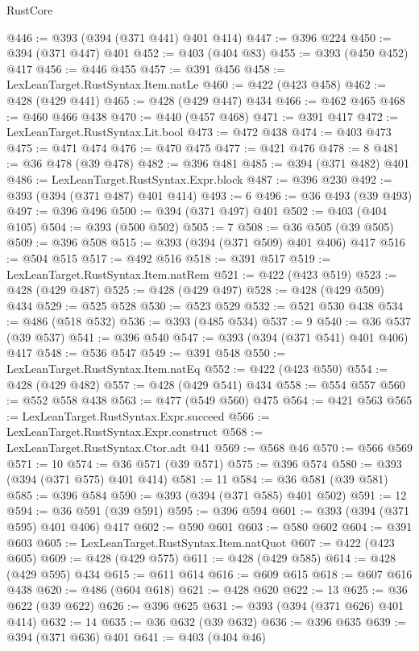 \begin{lexlean}{RustCore}
\begin{coremodule}
@446 := @393 (@394 (@371 @441) @401 @414)
@447 := @396 @224
@450 := @394 (@371 @447) @401
@452 := @403 (@404 @83)
@455 := @393 (@450 @452) @417
@456 := @446 @455
@457 := @391 @456
@458 := LexLeanTarget.RustSyntax.Item.natLe
@460 := @422 (@423 @458)
@462 := @428 (@429 @441)
@465 := @428 (@429 @447) @434
@466 := @462 @465
@468 := @460 @466 @438
@470 := @440 (@457 @468)
@471 := @391 @417
@472 := LexLeanTarget.RustSyntax.Lit.bool
@473 := @472 @438
@474 := @403 @473
@475 := @471 @474
@476 := @470 @475
@477 := @421 @476
@478 := 8
@481 := @36 @478 (@39 @478)
@482 := @396 @481
@485 := @394 (@371 @482) @401
@486 := LexLeanTarget.RustSyntax.Expr.block
@487 := @396 @230
@492 := @393 (@394 (@371 @487) @401 @414)
@493 := 6
@496 := @36 @493 (@39 @493)
@497 := @396 @496
@500 := @394 (@371 @497) @401
@502 := @403 (@404 @105)
@504 := @393 (@500 @502)
@505 := 7
@508 := @36 @505 (@39 @505)
@509 := @396 @508
@515 := @393 (@394 (@371 @509) @401 @406) @417
@516 := @504 @515
@517 := @492 @516
@518 := @391 @517
@519 := LexLeanTarget.RustSyntax.Item.natRem
@521 := @422 (@423 @519)
@523 := @428 (@429 @487)
@525 := @428 (@429 @497)
@528 := @428 (@429 @509) @434
@529 := @525 @528
@530 := @523 @529
@532 := @521 @530 @438
@534 := @486 (@518 @532)
@536 := @393 (@485 @534)
@537 := 9
@540 := @36 @537 (@39 @537)
@541 := @396 @540
@547 := @393 (@394 (@371 @541) @401 @406) @417
@548 := @536 @547
@549 := @391 @548
@550 := LexLeanTarget.RustSyntax.Item.natEq
@552 := @422 (@423 @550)
@554 := @428 (@429 @482)
@557 := @428 (@429 @541) @434
@558 := @554 @557
@560 := @552 @558 @438
@563 := @477 (@549 @560) @475
@564 := @421 @563
@565 := LexLeanTarget.RustSyntax.Expr.succeed
@566 := LexLeanTarget.RustSyntax.Expr.construct
@568 := LexLeanTarget.RustSyntax.Ctor.adt @41
@569 := @568 @46
@570 := @566 @569
@571 := 10
@574 := @36 @571 (@39 @571)
@575 := @396 @574
@580 := @393 (@394 (@371 @575) @401 @414)
@581 := 11
@584 := @36 @581 (@39 @581)
@585 := @396 @584
@590 := @393 (@394 (@371 @585) @401 @502)
@591 := 12
@594 := @36 @591 (@39 @591)
@595 := @396 @594
@601 := @393 (@394 (@371 @595) @401 @406) @417
@602 := @590 @601
@603 := @580 @602
@604 := @391 @603
@605 := LexLeanTarget.RustSyntax.Item.natQuot
@607 := @422 (@423 @605)
@609 := @428 (@429 @575)
@611 := @428 (@429 @585)
@614 := @428 (@429 @595) @434
@615 := @611 @614
@616 := @609 @615
@618 := @607 @616 @438
@620 := @486 (@604 @618)
@621 := @428 @620
@622 := 13
@625 := @36 @622 (@39 @622)
@626 := @396 @625
@631 := @393 (@394 (@371 @626) @401 @414)
@632 := 14
@635 := @36 @632 (@39 @632)
@636 := @396 @635
@639 := @394 (@371 @636) @401
@641 := @403 (@404 @46)

\end{coremodule}
\end{lexlean}
